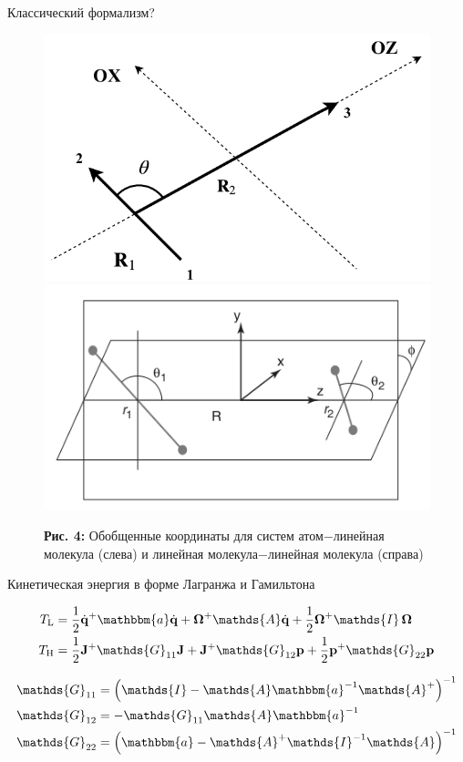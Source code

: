 \documentclass[10pt,usenames,pdf,hyperref={unicode},dvipsnames]{beamer}
\newcommand{\lb}{\left(}
\newcommand{\rb}{\right)}
\newcommand{\mf}{\mathbf}
\newcommand{\mycaption}[2]{
    \textbf{#1:} #2
}
\newcommand{\bOmega}{\boldsymbol{\Omega}}
\newcommand{\Tl}{T_\text{L}}
\newcommand{\Th}{T_\text{H}}
\newcommand{\bba}{\mathbbm{a}}
\newcommand{\bbA}{\mathds{A}}
\newcommand{\bbI}{\mathds{I}}
\newcommand{\bbG}{\mathds{G}}
\begin{document}
\begin{frame}{Классический формализм?}
    \vspace*{-0.5cm}
    \begin{figure}[H]
        \includegraphics[width=0.49\linewidth]{./pictures/triatom_coordinates.pdf}
        \includegraphics[width=0.49\linewidth]{./pictures/n2n2_coordinate_frame.png}
        \mycaption{Рис. 4}{Обобщенные координаты для систем атом$-$линейная молекула (слева) и линейная молекула$-$линейная молекула (справа)}
    \end{figure}
    \vspace*{-0.3cm}
    \begin{block}{Кинетическая энергия в форме Лагранжа и Гамильтона}
        \vspace*{-0.3cm}
        \begin{minipage}{0.6\linewidth}
            \begin{gather}
                \begin{aligned}
                    \Tl &= \frac{1}{2} \dot{\mf{q}}^+ \bba \dot{\mf{q}} + \bOmega^+ \bbA \dot{\mf{q}} + \frac{1}{2} \bOmega^+ \bbI \, \bOmega \\
                    \Th &= \frac{1}{2} \mf{J}^+ \bbG_{11} \mf{J} + \mf{J}^+ \bbG_{12} \mf{p} + \frac{1}{2} \mf{p}^+ \bbG_{22} \mf{p}
                \end{aligned} \notag
            \end{gather}
        \end{minipage}
        \begin{minipage}{0.39\linewidth}
            \begin{gather}
                \begin{aligned}
                    \bbG_{11} &= \lb \bbI - \bbA \bba^{-1} \bbA^{+} \rb^{-1} \\
                    \bbG_{12} &= -\bbG_{11} \bbA \bba^{-1} \\
                    \bbG_{22} &= \lb \bba - \bbA^{+} \bbI^{-1} \bbA \rb^{-1}
                \end{aligned} \notag
            \end{gather}
        \end{minipage}
    \end{block}
\end{frame}
\end{document}
